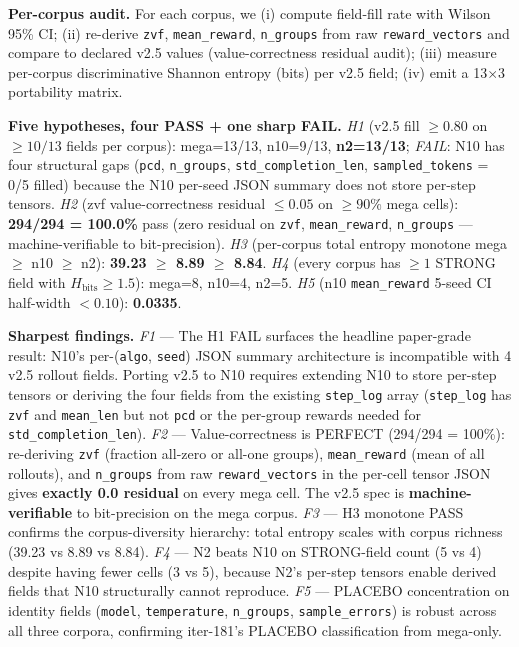 \documentclass{article}  \usepackage[preprint,nonatbib]{neurips_2026} \usepackage[numbers]{natbib}
\begin{document}
\textbf{Per-corpus audit.} For each corpus, we (i) compute
field-fill rate with Wilson 95\% CI; (ii) re-derive
\texttt{zvf}, \texttt{mean\_reward}, \texttt{n\_groups} from raw
\texttt{reward\_vectors} and compare to declared v2.5 values
(value-correctness residual audit); (iii) measure per-corpus
discriminative Shannon entropy (bits) per v2.5 field;
(iv) emit a 13$\times$3 portability matrix.

\textbf{Five hypotheses, four PASS + one sharp FAIL.}
\emph{H1} (v2.5 fill $\geq 0.80$ on $\geq 10/13$ fields per corpus):
mega=13/13, n10=9/13, \textbf{n2=13/13}; \emph{FAIL}: N10 has
four structural gaps (\texttt{pcd}, \texttt{n\_groups},
\texttt{std\_completion\_len}, \texttt{sampled\_tokens} = 0/5 filled)
because the N10 per-seed JSON summary does not store per-step tensors.
\emph{H2} (zvf value-correctness residual $\leq 0.05$ on $\geq 90\%$ mega cells):
\textbf{294/294 = 100.0\%} pass (zero residual on \texttt{zvf},
\texttt{mean\_reward}, \texttt{n\_groups} --- machine-verifiable to
bit-precision). \emph{H3} (per-corpus total entropy monotone
mega $\geq$ n10 $\geq$ n2): \textbf{39.23 $\geq$ 8.89 $\geq$ 8.84}.
\emph{H4} (every corpus has $\geq 1$ STRONG field with $H_{\text{bits}} \geq 1.5$):
mega=8, n10=4, n2=5. \emph{H5} (n10 \texttt{mean\_reward} 5-seed CI
half-width $< 0.10$): \textbf{0.0335}.

\textbf{Sharpest findings.}
\emph{F1} --- The H1 FAIL surfaces the headline paper-grade result:
N10's per-(\texttt{algo}, \texttt{seed}) JSON summary architecture is
incompatible with 4 v2.5 rollout fields. Porting v2.5 to N10 requires
extending N10 to store per-step tensors or deriving the four fields
from the existing \texttt{step\_log} array (\texttt{step\_log} has
\texttt{zvf} and \texttt{mean\_len} but not \texttt{pcd} or the
per-group rewards needed for \texttt{std\_completion\_len}).
\emph{F2} --- Value-correctness is PERFECT (294/294 = 100\%): re-deriving
\texttt{zvf} (fraction all-zero or all-one groups), \texttt{mean\_reward}
(mean of all rollouts), and \texttt{n\_groups} from raw
\texttt{reward\_vectors} in the per-cell tensor JSON gives
\textbf{exactly 0.0 residual} on every mega cell. The v2.5 spec is
\textbf{machine-verifiable} to bit-precision on the mega corpus.
\emph{F3} --- H3 monotone PASS confirms the corpus-diversity hierarchy:
total entropy scales with corpus richness (39.23 vs 8.89 vs 8.84).
\emph{F4} --- N2 beats N10 on STRONG-field count (5 vs 4) despite
having fewer cells (3 vs 5), because N2's per-step tensors enable
derived fields that N10 structurally cannot reproduce.
\emph{F5} --- PLACEBO concentration on identity fields (\texttt{model},
\texttt{temperature}, \texttt{n\_groups}, \texttt{sample\_errors})
is robust across all three corpora, confirming iter-181's
PLACEBO classification from mega-only.
\end{document}

